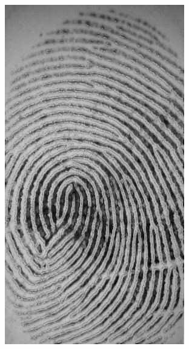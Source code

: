 \documentclass{beamer}
\begin{document}
{\begin{figure}[!ht]
\begin{subfigure}[ht]{0.15\textwidth}
            \includegraphics[width=\textwidth]{fingerprints/2002Db2a/1_2_background.jpg}
        \end{subfigure}
        \qquad
        \begin{subfigure}[ht]{0.15\textwidth}

\end{subfigure}
\end{figure}}
\end{document}
